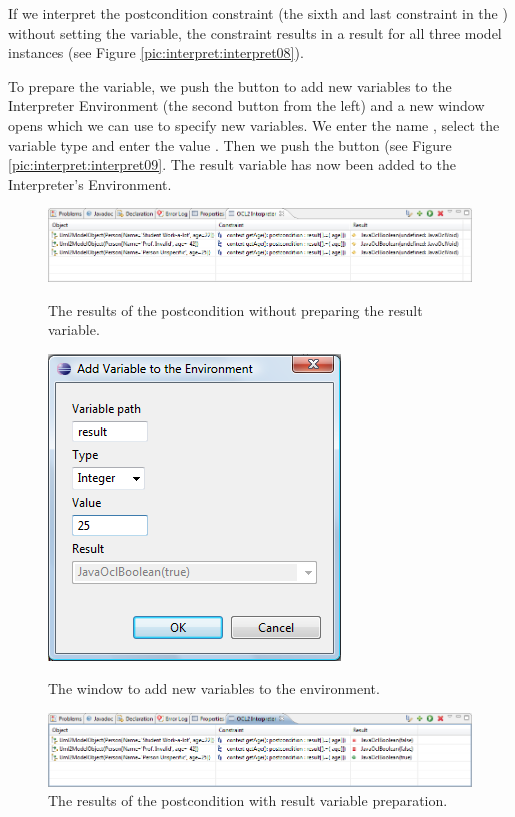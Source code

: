 If we interpret the postcondition constraint (the sixth and last constraint in the ) without setting the  variable, the constraint results in a  result for all three model instances (see Figure \ref{pic:interpret:interpret08}).

To prepare the variable, we push the button to add new variables to the Interpreter Environment (the second button from the left) and a new window opens which we can use to specify new variables. We enter the name , select the variable type  and enter the value . Then we push the  button (see Figure \ref{pic:interpret:interpret09}. The result variable has now been added to the Interpreter's Environment.

\begin{figure}[!b]
	\centering
	\includegraphics[width=1.0\linewidth]{figures/interpreter/interpret08}
	\caption{The results of the postcondition without preparing the result variable.}
	\label{pic:interpret:interpret08}

  \vspace{3.0em}
	
	\centering
	\includegraphics[width=0.5\linewidth]{figures/interpreter/interpret09}
	\caption{The window to add new variables to the environment.}
	\label{pic:interpret:interpret09}

  \vspace{3.0em}
	
	\centering
	\includegraphics[width=1.0\linewidth]{figures/interpreter/interpret10}
	\caption{The results of the postcondition with result variable preparation.}
	\label{pic:interpret:interpret10}
\end{figure}

